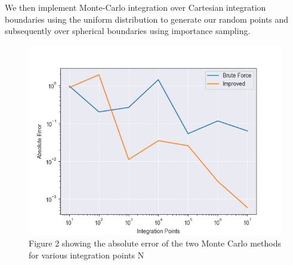 \documentclass{emulateapj}
\begin{document}
 We then implement Monte-Carlo integration over Cartesian integration boundaries using the uniform distribution to generate our random points and subsequently over spherical boundaries using importance sampling.
\begin{figure}[H]
    \centering
    \includegraphics [scale=0.5]{monteerror.png}
    \caption{Figure 2 showing the absolute error of the two Monte Carlo methods for various integration points N}
    \label{fig:fig2}
\end{figure}
\end{document}
